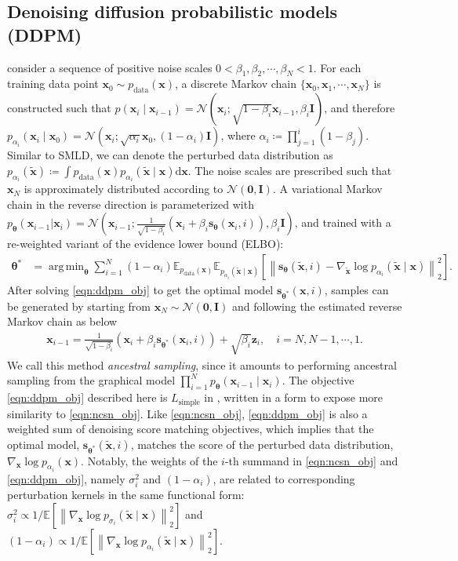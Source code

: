 \documentclass{article} \usepackage{iclr2021_conference,times}
\newcommand{\mbb}[1]{\mathbb{#1}}
\newcommand{\ud}{\mathrm{d}}
\newcommand{\mcal}{\mathcal}
\newcommand{\norm}[1]{\left\lVert#1\right\rVert}
\DeclareMathOperator*{\argmin}{arg\,min}
\newcommand{\bfx}{\mathbf{x}}
\newcommand{\bfz}{\mathbf{z}}
\newcommand{\bfI}{\mathbf{I}}
\newcommand{\bfzero}{\mathbf{0}}
\newcommand{\bftheta}{{\boldsymbol{\theta}}}
\newcommand{\bfs}{\mathbf{s}}
\newcommand{\pd}{p_{\mathrm{data}}}
\begin{document}
\subsection{Denoising diffusion probabilistic models (DDPM)}\label{sec:ddpm}
\citet{sohl2015deep,ho2020denoising} consider a sequence of positive noise scales $0 < \beta_1, \beta_2, \cdots, \beta_N < 1$. For each training data point $\bfx_0 \sim \pd(\bfx)$, a discrete Markov chain $\{ \bfx_0, \bfx_1, \cdots, \bfx_N \}$ is constructed such that $p(\bfx_{i} \mid \bfx_{i-1}) = \mcal{N}(\bfx_{i} ; \sqrt{1-\beta_i} \bfx_{i-1}, \beta_i \bfI)$, and therefore $p_{\alpha_i}(\bfx_i \mid \bfx_0) = \mcal{N}(\bfx_i ;\sqrt{\alpha_i} \bfx_0, (1-\alpha_i)\bfI)$, where $\alpha_i \coloneqq \prod_{j=1}^i (1-\beta_j)$. Similar to SMLD, we can denote the perturbed data distribution as $p_{\alpha_i}(\tilde{\bfx}) \coloneqq \int p_\text{data}(\bfx) p_{\alpha_i}(\tilde{\bfx} \mid \bfx) \ud \bfx$. The noise scales are prescribed such that $\bfx_N$ is approximately distributed according to $\mcal{N}(\bfzero, \bfI)$. A variational Markov chain in the reverse direction is parameterized with $p_\bftheta(\bfx_{i-1} | \bfx_{i}) = \mcal{N}(\bfx_{i-1}; \frac{1}{\sqrt{1-\beta_i}} (\bfx_i + \beta_i \bfs_\bftheta(\bfx_i, i)), \beta_i \bfI)$, and trained with a re-weighted variant of the evidence lower bound (ELBO):
\begin{align}
\bftheta^* &= \argmin_\bftheta
    \sum_{i=1}^{N} (1-\alpha_i) \mbb{E}_{\pd(\bfx)}\mbb{E}_{p_{\alpha_i}(\tilde{\bfx} \mid \bfx)}[\norm{ \bfs_\bftheta(\tilde{\bfx}, i) - \nabla_{\tilde{\bfx}} \log p_{\alpha_i}(\tilde{\bfx} \mid \bfx)}_2^2]. \label{eqn:ddpm_obj}
\end{align}
After solving \cref{eqn:ddpm_obj} to get the optimal model $\bfs_{\bftheta^*}(\bfx, i)$, samples can be generated by starting from $\bfx_N \sim \mcal{N}(\bfzero, \bfI)$ and following the estimated reverse Markov chain as below
\begin{align}
    \bfx_{i-1} = \frac{1}{\sqrt{1-\beta_i}} (\bfx_i + \beta_i \bfs_{\bftheta^*}(\bfx_i, i)) + \sqrt{\beta_i}\bfz_i, \quad i=N, N-1, \cdots, 1. \label{eqn:ddpm_sampling}
\end{align}
We call this method \emph{ancestral sampling}, since it amounts to performing ancestral sampling from the graphical model $\prod_{i=1}^N p_\bftheta(\bfx_{i-1} \mid \bfx_i)$. The objective \cref{eqn:ddpm_obj} described here is $L_{\text{simple}}$ in \citet{ho2020denoising}, written in a form to expose more similarity to \cref{eqn:ncsn_obj}. 
Like \cref{eqn:ncsn_obj}, \cref{eqn:ddpm_obj} is also a weighted sum of denoising score matching objectives, which implies that the optimal model, $\bfs_{\bftheta^*}(\tilde{\bfx}, i)$, matches the score of the perturbed data distribution, $\nabla_\bfx \log p_{\alpha_i}(\bfx)$. Notably, the weights of the $i$-th summand in \cref{eqn:ncsn_obj} and \cref{eqn:ddpm_obj}, namely $\sigma_i^2$ and $(1-\alpha_i)$, are related to corresponding perturbation kernels in the same functional form: $\sigma_i^2 \propto 1/\mbb{E}[\norm{\nabla_\bfx \log p_{\sigma_i}(\tilde{\bfx} \mid \bfx)}_2^2]$ and $(1-\alpha_i) \propto 1/\mbb{E}[\norm{\nabla_\bfx \log p_{\alpha_i}(\tilde{\bfx} \mid \bfx)}_2^2]$. 
\end{document}
